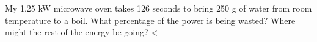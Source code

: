         My 1.25 kW microwave oven takes 126 seconds to bring
        250 g of water from room temperature to a boil. What
        percentage of the power is being wasted? Where might the
        rest of the energy be going?
        <%

